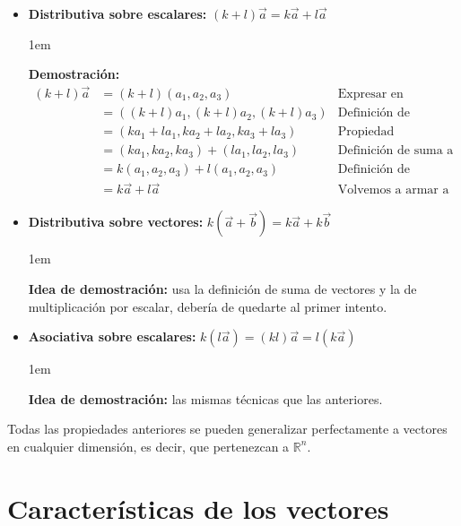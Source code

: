 \documentclass[12pt, fleqn]{report}                             %
\newenvironment{SmallIndentation}[1][0.75em]                    %
    {\begin{adjustwidth}{#1}{}\begin{footnotesize}}                 %
    {\end{footnotesize}\end{adjustwidth}}                           %
\newcommand{\ve}[1]{\vec{#1}}									%
\begin{document}
\begin{itemize}
				\item \textbf{Distributiva sobre escalares:} $(k+l)\ve{a}=k\ve{a}+l\ve{a}$
				
				\begin{SmallIndentation}[1em]
					\textbf{Demostración:}
					\begin{align*}
						(k+l)\ve{a} &= (k+l)(a_1, a_2, a_3) &\mbox{Expresar en coordenadas}\\
						&= ((k+l)a_1, (k+l)a_2, (k+l)a_3) &\mbox{Definición de producto por escalar}\\
						&= (ka_1 + la_1, ka_2 + la_2, ka_3 + la_3) &\mbox{Propiedad distributiva en los reales}\\
						&= (ka_1, ka_2, ka_3) + (la_1, la_2, la_3) &\mbox{Definición de suma a la inversa}\\
						&= k(a_1, a_2, a_3) + l(a_1, a_2, a_3) &\mbox{Definición de producto a la inversa}\\
						&= k\ve{a} + l\ve{a} &\mbox{Volvemos a armar a los vectores}
					\end{align*}
				\end{SmallIndentation}
				
				\item \textbf{Distributiva sobre vectores:} $k\left(\ve{a}+\ve{b}\right)=k\ve{a}+k\ve{b}$
				
				\begin{SmallIndentation}[1em]
					\textbf{Idea de demostración:} usa la definición de suma de vectores y la de multiplicación por escalar, debería de quedarte al primer intento.
				\end{SmallIndentation}
				
				\item \textbf{Asociativa sobre escalares:} $k\left(l\ve{a}\right)=(kl)\ve{a}=l\left(k\ve{a}\right)$
				
				\begin{SmallIndentation}[1em]
					\textbf{Idea de demostración:} las mismas técnicas que las anteriores.
				\end{SmallIndentation}
			\end{itemize}
		
			Todas las propiedades anteriores se pueden generalizar perfectamente a vectores en cualquier dimensión, es decir, que pertenezcan a $\mathbb{R}^n$.
			
		\section{Características de los vectores}
		
\end{document}
